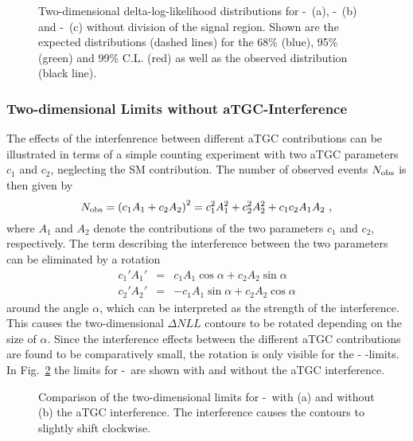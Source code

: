 \begin{figure}
	\centering
	\caption[Two-dimensional delta-log-likelihood distributions for the three combinations of aTGC parameters without division of the signal region]{Two-dimensional delta-log-likelihood distributions for \Tcwww -\Tccw \ (a), \Tcwww -\Tcb \ (b) and \Tccw -\Tcb\ (c) without division of the signal region. Shown are the expected distributions (dashed lines) for the 68\% (blue), 95\% (green) and 99\% C.L. (red) as well as the observed distribution (black line).}
	\label{fig:limits:2dlimits_nocat}	
\end{figure}
\subsubsection*{Two-dimensional Limits without aTGC-Interference}
The effects of the interfenrence between different aTGC contributions can be illustrated in terms of a simple counting experiment with two aTGC parameters $c_1$ and $c_2$, neglecting the SM contribution. The number of observed events $N_{\rm obs}$ is then given by
\begin{equation}
N_{\rm obs} = \left( c_1A_1 + c_2A_2 \right)^2 = c_1^2A_1^2 + c_2^2A_2^2 + c_1c_2A_1A_2 ~,
\end{equation}
where $A_1$ and $A_2$ denote the contributions of the two parameters $c_1$ and $c_2$, respectively. The term describing the interference between the two parameters can be eliminated by a rotation
\begin{eqnarray}
c_1'A_1' &=& c_1A_1\cos \alpha + c_2A_2\sin \alpha \\
c_2'A_2' &=& -c_1A_1\sin \alpha + c_2A_2\cos \alpha
\end{eqnarray}
around the angle $\alpha$, which can be interpreted as the strength of the interference. This causes the two-dimensional $\Delta NLL$ contours to be rotated depending on
the size of $\alpha$. Since the interference effects between the different aTGC contributions are found to be comparatively small, the rotation is only visible for the \Tccw - \Tcb -limits. In Fig.~\ref{fig:limits:noatgcint} the limits for \Tccw -\Tcb \ are shown with and without the aTGC interference.

\begin{figure}
	\centering
	\caption[Comparison of the two-dimensional limits for \Tccw -\Tcb \ with and without the aTGC interference]{Comparison of the two-dimensional limits for \Tccw -\Tcb \ with (a) and without (b) the aTGC interference. The interference causes the contours to slightly shift clockwise.}
	\label{fig:limits:noatgcint}
\end{figure}